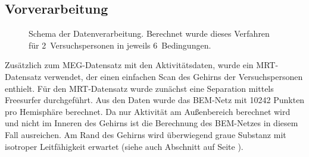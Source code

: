 \documentclass[doc,a4paper,12pt]{apa6}
\makeatletter
\DeclareRobustCommand*{\nameref}[1]{%
      \glqq{\myorg@nameref{#1}}\grqq%
    }%
\makeatother
\begin{document}
\subsection{Vorverarbeitung}

\begin{figure}
  \centering
  \setlength{\fboxsep}{5mm}
  \vspace*{3mm}
  \caption[Schema der Datenverarbeitung]{Schema der Datenverarbeitung. Berechnet wurde dieses Verfahren für 2~Versuchspersonen in jeweils 6~Bedingungen.}
  \label{img:verfahren}
\end{figure}

Zusätzlich zum MEG-Datensatz mit den Aktivitätsdaten, wurde ein MRT-Datensatz verwendet, der einen einfachen Scan des Gehirns der Versuchspersonen enthielt. Für den MRT-Datensatz wurde zunächst eine Separation mittels Freesurfer durchgeführt. Aus den Daten wurde das BEM-Netz mit 10242 Punkten pro Hemisphäre berechnet. Da nur Aktivität am Außenbereich berechnet wird und nicht im Inneren des Gehirns ist die Berechnung des BEM-Netzes in diesem Fall ausreichen. Am Rand des Gehirns wird überwiegend graue Substanz mit isotroper Leitfähigkeit erwartet (siehe auch Abschnitt \nameref{sec:segment} auf Seite \pageref{sec:segment}).
\end{document}
